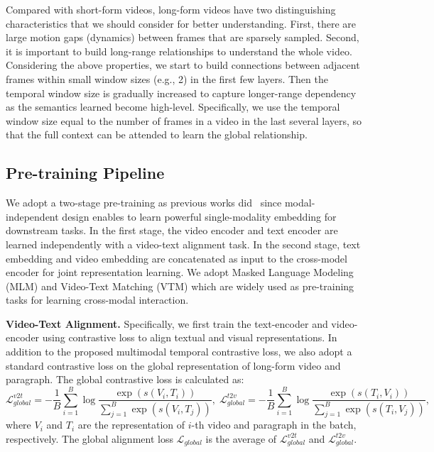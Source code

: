 \documentclass{article}
\begin{document}
Compared with short-form videos, long-form videos have two distinguishing characteristics that we should consider for better understanding. First, there are large motion gaps (dynamics) between frames that are sparsely sampled. Second, it is important to build long-range relationships to understand the whole video. Considering the above properties, we start to build connections between adjacent frames within small window sizes (e.g., 2) in the first few layers. 
Then the temporal window size is gradually increased to capture longer-range dependency as the semantics learned become high-level.
Specifically, we use the temporal window size equal to the number of frames in a video in the last several layers, so that the full context can be attended to learn the global relationship.

\subsection{Pre-training Pipeline}\label{pipeline}

We adopt a two-stage pre-training as previous works did~\cite{xue2021hdvila} since modal-independent design enables to learn powerful single-modality embedding for downstream tasks. In the first stage, the video encoder and text encoder are learned independently with a video-text alignment task. In the second stage, text embedding and video embedding are concatenated as input to the cross-model encoder for joint representation learning. We adopt Masked Language Modeling (MLM) and Video-Text Matching (VTM) which are widely used as pre-training tasks for learning cross-modal interaction.

\textbf{Video-Text Alignment.}
Specifically, we first train the text-encoder and video-encoder using contrastive loss to align textual and visual representations. In addition to the proposed multimodal temporal contrastive loss, we also adopt a standard contrastive loss on the global representation of long-form video and paragraph. The global contrastive loss is calculated as:
\begin{equation}
\mathcal{L}_{global}^{v2t} =-\frac{1}{B} \sum_{i=1}^{B} \log \frac{\exp \left(s(V_i, T_i)\right)}{\sum_{j=1}^{B} \exp \left(s(V_i, T_j)\right)}, \;
\mathcal{L}_{global}^{t2v} =-\frac{1}{B} \sum_{i=1}^{B} \log \frac{\exp \left(s(T_i, V_i)\right)}{\sum_{j=1}^{B} \exp \left(s(T_i, V_j)\right)},
\end{equation}
where $V_i$ and $T_i$ are the representation of $i$-th video and paragraph in the batch, respectively. The global alignment loss $\mathcal{L}_{global}$ is the average of $\mathcal{L}_{global}^{v2t}$ and $\mathcal{L}_{global}^{t2v}$. 
\end{document}
